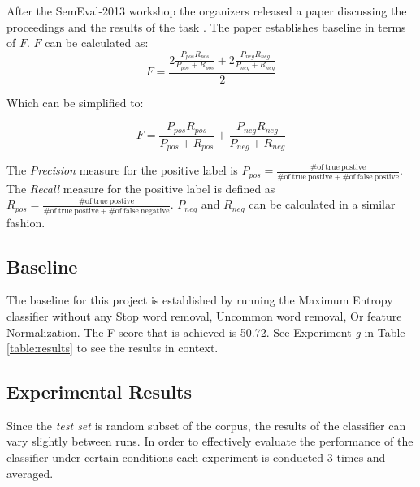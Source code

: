 \documentclass[final,3p,12pt]{elsarticle}
\begin{document}
After the SemEval-2013 workshop the organizers released a paper discussing the
proceedings and the results of the task \cite{Nakov2013}. The paper establishes
baseline in terms of $F$. $F$ can be calculated as:
\begin{equation}
    F = \frac{2 \frac{P_{pos}R_{pos}}{P_{pos} + R_{pos}} +
    2 \frac{P_{neg}R_{neg}}{P_{neg} + R_{neg}}}{2}
\end{equation}

Which can be simplified to:

\begin{equation}
    F = \frac{P_{pos}R_{pos}}{P_{pos} + R_{pos}} + \frac{P_{neg}R_{neg}}{P_{neg} + R_{neg}}
\end{equation}

The \textit{Precision} measure for the positive label is $P_{pos} =
\frac{\mathrm{\# of\ true\ postive}}{\mathrm{\# of\ true\ postive} + \mathrm{\#
of\ false\ postive} }$. The \textit{Recall} measure for the positive label is
defined as $R_{pos} = \frac{\mathrm{\# of\ true\ postive}}{\mathrm{\# of\ true\
postive} + \mathrm{\# of\ false\ negative} }$. $P_{neg}$ and $R_{neg}$ can be
calculated in a similar fashion.

\subsection{Baseline}

The baseline for this project is established by running the Maximum Entropy
classifier without any Stop word removal, Uncommon word removal, Or feature
Normalization. The F-score that is achieved is 50.72. See Experiment \textit{g}
in Table \ref{table:results} to see the results in context.

\subsection{Experimental Results}

Since the \textit{test set} is random subset of the corpus, the results of the
classifier can vary slightly between runs. In order to effectively evaluate the
performance of the classifier under certain conditions each experiment is
conducted 3 times and averaged.
\end{document}
